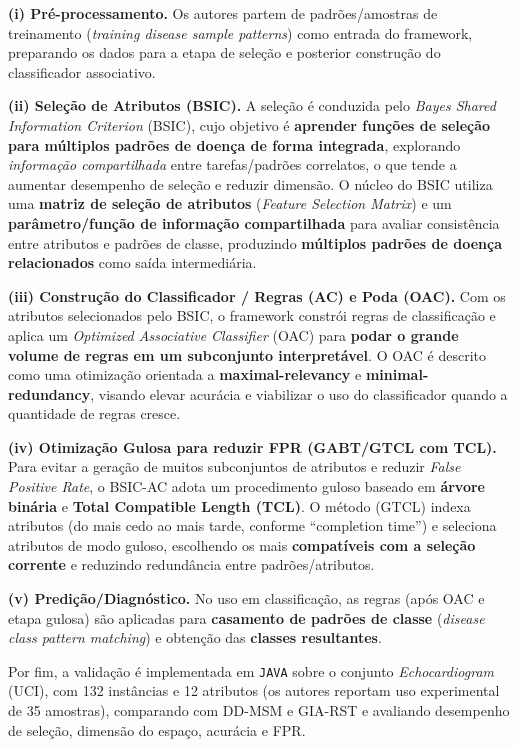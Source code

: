 \textbf{(i) Pré-processamento.}
Os autores partem de padrões/amostras de treinamento (\textit{training disease sample patterns}) como entrada do framework, preparando os dados para a etapa de seleção e posterior construção do classificador associativo. 

\textbf{(ii) Seleção de Atributos (BSIC).}
A seleção é conduzida pelo \textit{Bayes Shared Information Criterion} (BSIC), cujo objetivo é \textbf{aprender funções de seleção para múltiplos padrões de doença de forma integrada}, explorando \textit{informação compartilhada} entre tarefas/padrões correlatos, o que tende a aumentar desempenho de seleção e reduzir dimensão. O núcleo do BSIC utiliza uma \textbf{matriz de seleção de atributos} (\textit{Feature Selection Matrix}) e um \textbf{parâmetro/função de informação compartilhada} para avaliar consistência entre atributos e padrões de classe, produzindo \textbf{múltiplos padrões de doença relacionados} como saída intermediária. 

\textbf{(iii) Construção do Classificador / Regras (AC) e Poda (OAC).}
Com os atributos selecionados pelo BSIC, o framework constrói regras de classificação e aplica um \textit{Optimized Associative Classifier} (OAC) para \textbf{podar o grande volume de regras em um subconjunto interpretável}. O OAC é descrito como uma otimização orientada a \textbf{maximal-relevancy} e \textbf{minimal-redundancy}, visando elevar acurácia e viabilizar o uso do classificador quando a quantidade de regras cresce. 

\textbf{(iv) Otimização Gulosa para reduzir FPR (GABT/GTCL com TCL).}
Para evitar a geração de muitos subconjuntos de atributos e reduzir \textit{False Positive Rate}, o BSIC-AC adota um procedimento guloso baseado em \textbf{árvore binária} e \textbf{Total Compatible Length (TCL)}. O método (GTCL) indexa atributos (do mais cedo ao mais tarde, conforme “completion time”) e seleciona atributos de modo guloso, escolhendo os mais \textbf{compatíveis com a seleção corrente} e reduzindo redundância entre padrões/atributos. 

\textbf{(v) Predição/Diagnóstico.}
No uso em classificação, as regras (após OAC e etapa gulosa) são aplicadas para \textbf{casamento de padrões de classe} (\textit{disease class pattern matching}) e obtenção das \textbf{classes resultantes}. 

Por fim, a validação é implementada em \texttt{JAVA} sobre o conjunto \textit{Echocardiogram} (UCI), com 132 instâncias e 12 atributos (os autores reportam uso experimental de 35 amostras), comparando com DD-MSM e GIA-RST e avaliando desempenho de seleção, dimensão do espaço, acurácia e FPR. 


